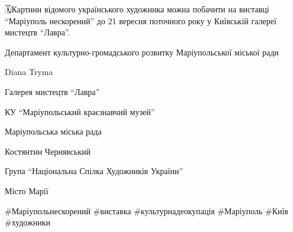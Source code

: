 🗓Картини відомого українського художника можна побачити на виставці
\enquote{Маріуполь нескорений} до 21 вересня поточного року у Київській галереї
мистецтв \enquote{Лавра}.

Департамент культурно-громадського розвитку Маріупольської міської ради \par
Diana Tryma \par
Галерея мистецтв \enquote{Лавра} \par
КУ \enquote{Маріупольський краєзнавчий музей} \par
Маріупольська міська рада \par
Костянтин Чернявський \par
Група \enquote{Національна Спілка Художників України} \par
Місто Марії \par
\#Маріупольнескорений \#виставка \#культурнадеокупація \#Маріуполь \#Київ \#художники\par
